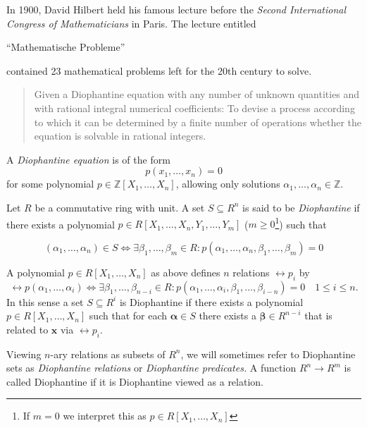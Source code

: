 
In 1900, David Hilbert held his famous lecture before the \emph{Second International Congress of Mathematicians} in Paris.
The lecture entitled \begin{german}\enquote{Mathematische Probleme}\end{german} contained 23 mathematical problems left for the 20th century to solve.


\begin{quotation}
    Given a Diophantine equation with any number of unknown quantities and with rational integral numerical coefficients: To devise a process according to which it can be determined by a finite number of operations whether the equation is solvable in rational integers.
\end{quotation}

A \emph{Diophantine equation} is of the form
%
\[ p(x_1, …, x_n) = 0 \]
%
for some polynomial $p ∈ ℤ[X_1, …, X_n]$, allowing only solutions $α_1,…,α_n ∈ ℤ$.


\begin{defin}
    Let $R$ be a commutative ring with unit.
    A set $S \subseteq R^n$ is said to be \emph{Diophantine} if there exists a polynomial $p ∈ R[X_1,…,X_n, Y_1,…,Y_m]$ ($m ≥ 0$\footnote{If $m = 0$ we interpret this as $p ∈ R[X_1,…,X_n]$}) such that

    \[ (α_1,…,α_n) ∈ S \Leftrightarrow ∃ β_1,…,β_m ∈ R: p(α_1,…,α_n,β_1,…,β_m) = 0 \]
\end{defin}

A polynomial $p ∈ R[X_1, …, X_n]$ as above defines $n$ relations $\rel{p}_i$ by
\[
  \rel{p}(α_1, …, α_i)  \Leftrightarrow
   ∃ β_1, …, β_{n - i} ∈ R : p(α_1, …, α_i, β_1, …, β_{i - n}) = 0 \quad
   1 ≤ i ≤ n.
\]
In this sense a set $S \subseteq R^i$ is Diophantine if there exists a
polynomial $p ∈ R[X_1, …, X_n]$ such that for each $\mathbf α ∈ S$ there exists
a $\mathbf β ∈ R^{n - i}$ that is related to $\mathbf x$ via $\rel p_i$.

Viewing $n$-ary relations as subsets of $R^n$, we will sometimes refer to
Diophantine sets as \emph{Diophantine relations} or \emph{Diophantine
predicates.} A function $R^n → R^m$ is called Diophantine if it is Diophantine
viewed as a relation.

